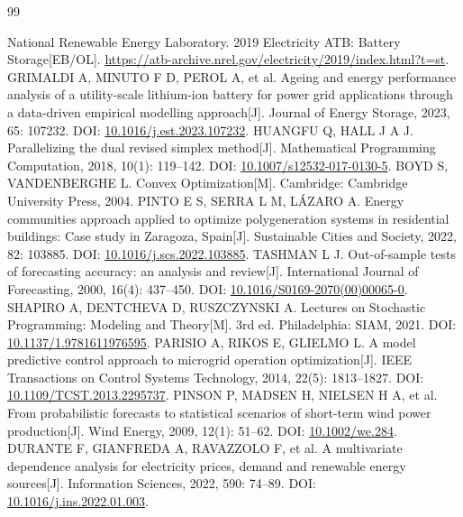 \begin{thebibliography}{99}
\raggedright
{} National Renewable Energy Laboratory. 2019 Electricity ATB: Battery Storage[EB/OL]. \url{https://atb-archive.nrel.gov/electricity/2019/index.html?t=st}.
 GRIMALDI A, MINUTO F D, PEROL A, et al. Ageing and energy performance analysis of a utility-scale lithium-ion battery for power grid applications through a data-driven empirical modelling approach[J]. Journal of Energy Storage, 2023, 65: 107232. DOI: \url{10.1016/j.est.2023.107232}.
 HUANGFU Q, HALL J A J. Parallelizing the dual revised simplex method[J]. Mathematical Programming Computation, 2018, 10(1): 119--142. DOI: \url{10.1007/s12532-017-0130-5}.
 BOYD S, VANDENBERGHE L. Convex Optimization[M]. Cambridge: Cambridge University Press, 2004.
 PINTO E S, SERRA L M, LÁZARO A. Energy communities approach applied to optimize polygeneration systems in residential buildings: Case study in Zaragoza, Spain[J]. Sustainable Cities and Society, 2022, 82: 103885. DOI: \url{10.1016/j.scs.2022.103885}.
 TASHMAN L J. Out-of-sample tests of forecasting accuracy: an analysis and review[J]. International Journal of Forecasting, 2000, 16(4): 437--450. DOI: \url{10.1016/S0169-2070(00)00065-0}.
 SHAPIRO A, DENTCHEVA D, RUSZCZYNSKI A. Lectures on Stochastic Programming: Modeling and Theory[M]. 3rd ed. Philadelphia: SIAM, 2021. DOI: \url{10.1137/1.9781611976595}.
 PARISIO A, RIKOS E, GLIELMO L. A model predictive control approach to microgrid operation optimization[J]. IEEE Transactions on Control Systems Technology, 2014, 22(5): 1813--1827. DOI: \url{10.1109/TCST.2013.2295737}.
 PINSON P, MADSEN H, NIELSEN H A, et al. From probabilistic forecasts to statistical scenarios of short-term wind power production[J]. Wind Energy, 2009, 12(1): 51--62. DOI: \url{10.1002/we.284}.
 DURANTE F, GIANFREDA A, RAVAZZOLO F, et al. A multivariate dependence analysis for electricity prices, demand and renewable energy sources[J]. Information Sciences, 2022, 590: 74--89. DOI: \url{10.1016/j.ins.2022.01.003}.
\end{thebibliography}

